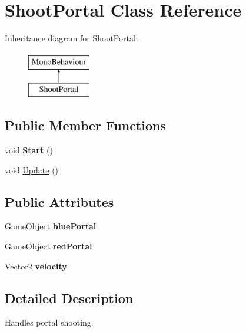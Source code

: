\hypertarget{class_shoot_portal}{}\section{Shoot\+Portal Class Reference}
\label{class_shoot_portal}
Inheritance diagram for Shoot\+Portal\+:\begin{figure}[H]
\begin{center}
\leavevmode
\includegraphics[height=2.000000cm]{class_shoot_portal}
\end{center}
\end{figure}
\subsection*{Public Member Functions}
\begin{DoxyCompactItemize}
\item 
\mbox{\label{class_shoot_portal_afb543600d8358d399c285b327093a922}} 
void {\bfseries Start} ()
\item 
void \mbox{\hyperlink{class_shoot_portal_a1160266ce719d6b93655286e0909bae8}{Update}} ()
\end{DoxyCompactItemize}
\subsection*{Public Attributes}
\begin{DoxyCompactItemize}
\item 
\mbox{\label{class_shoot_portal_a715a70a24a5337424fc183a04cc0a3d2}} 
Game\+Object {\bfseries blue\+Portal}
\item 
\mbox{\label{class_shoot_portal_ad355d40bf4cc38c8deeb65c71c8b1d13}} 
Game\+Object {\bfseries red\+Portal}
\item 
\mbox{\label{class_shoot_portal_ab1052b79920f7bdb495e3cc8af5d429d}} 
Vector2 {\bfseries velocity}
\end{DoxyCompactItemize}


\subsection{Detailed Description}
Handles portal shooting. 

